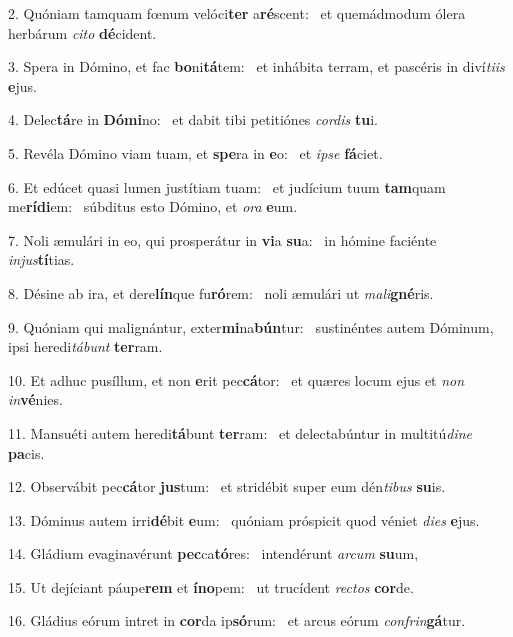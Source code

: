 2. Quóniam tamquam fœnum velóci\textbf{ter} a\textbf{ré}scent: \ast\  et quemádmodum ólera herbárum \textit{ci}\textit{to} \textbf{dé}cident.\

3. Spera in Dómino, et fac \textbf{bo}ni\textbf{tá}tem: \ast\  et inhábita terram, et pascéris in diví\textit{ti}\textit{is} \textbf{e}jus.\

4. Delec\textbf{tá}re in \textbf{Dó}\textbf{mi}no: \ast\  et dabit tibi petitiónes \textit{cor}\textit{dis} \textbf{tu}i.\

5. Revéla Dómino viam tuam, et \textbf{spe}ra in \textbf{e}o: \ast\  et \textit{ip}\textit{se} \textbf{fá}ciet.\

6. Et edúcet quasi lumen justítiam tuam: \dag\  et judícium tuum \textbf{tam}quam me\textbf{rí}\textbf{di}em: \ast\  súbditus esto Dómino, et \textit{o}\textit{ra} \textbf{e}um.\

7. Noli æmulári in eo, qui prosperátur in \textbf{vi}a \textbf{su}a: \ast\  in hómine faciénte \textit{in}\textit{jus}\textbf{tí}tias.\

8. Désine ab ira, et dere\textbf{lín}que fu\textbf{ró}rem: \ast\  noli æmulári ut \textit{ma}\textit{li}\textbf{gné}ris.\

9. Quóniam qui malignántur, exter\textbf{mi}na\textbf{bún}tur: \ast\  sustinéntes autem Dóminum, ipsi heredi\textit{tá}\textit{bunt} \textbf{ter}ram.\

10. Et adhuc pusíllum, et non \textbf{e}rit pec\textbf{cá}tor: \ast\  et quæres locum ejus et \textit{non} \textit{in}\textbf{vé}nies.\

11. Mansuéti autem heredi\textbf{tá}bunt \textbf{ter}ram: \ast\  et delectabúntur in multitú\textit{di}\textit{ne} \textbf{pa}cis.\

12. Observábit pec\textbf{cá}tor \textbf{jus}tum: \ast\  et stridébit super eum dén\textit{ti}\textit{bus} \textbf{su}is.\

13. Dóminus autem irri\textbf{dé}bit \textbf{e}um: \ast\  quóniam próspicit quod véniet \textit{di}\textit{es} \textbf{e}jus.\

14. Gládium evaginavérunt \textbf{pec}ca\textbf{tó}res: \ast\  intendérunt \textit{ar}\textit{cum} \textbf{su}um,\

15. Ut dejíciant páupe\textbf{rem} et \textbf{ín}\textbf{o}pem: \ast\  ut trucídent \textit{rec}\textit{tos} \textbf{cor}de.\

16. Gládius eórum intret in \textbf{cor}da ip\textbf{só}rum: \ast\  et arcus eórum \textit{con}\textit{frin}\textbf{gá}tur.\

